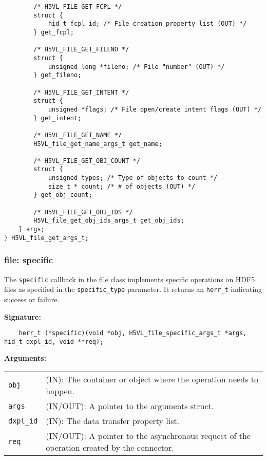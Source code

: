 \begin{lstlisting}
        /* H5VL_FILE_GET_FCPL */
        struct {
            hid_t fcpl_id; /* File creation property list (OUT) */
        } get_fcpl;

        /* H5VL_FILE_GET_FILENO */
        struct {
            unsigned long *fileno; /* File "number" (OUT) */
        } get_fileno;

        /* H5VL_FILE_GET_INTENT */
        struct {
            unsigned *flags; /* File open/create intent flags (OUT) */
        } get_intent;

        /* H5VL_FILE_GET_NAME */
        H5VL_file_get_name_args_t get_name;

        /* H5VL_FILE_GET_OBJ_COUNT */
        struct {
            unsigned types; /* Type of objects to count */
            size_t * count; /* # of objects (OUT) */
        } get_obj_count;

        /* H5VL_FILE_GET_OBJ_IDS */
        H5VL_file_get_obj_ids_args_t get_obj_ids;
    } args;
} H5VL_file_get_args_t;

\end{lstlisting}

\subsubsection{file: specific}
The \texttt{specific} callback in the file class implements specific operations on HDF5 files as specified in the \texttt{specific\_type} parameter. It returns an \texttt{herr\_t} indicating success or failure.\bigskip

\begin{mdframed}[style=bgbox] 
\textbf{Signature:}
\begin{lstlisting}
    herr_t (*specific)(void *obj, H5VL_file_specific_args_t *args, hid_t dxpl_id, void **req);
\end{lstlisting}

\textbf{Arguments:}\\
\begin{tabular}{l p{13.5cm}}
  \texttt{obj} & (IN): The container or object where the operation needs
  to happen.\\
  \texttt{args} & (IN/OUT): A pointer to the arguments struct.\\
  \texttt{dxpl\_id} & (IN): The data transfer property list.\\
  \texttt{req} & (IN/OUT): A pointer to the asynchronous request of the
  operation created by the connector.\\
\end{tabular}
\end{mdframed}

